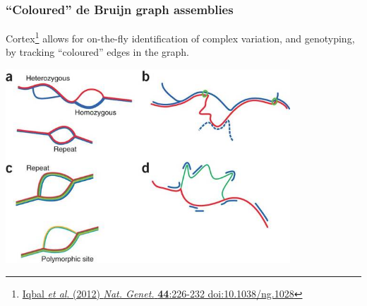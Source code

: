 \begin{frame}
  \frametitle{``Coloured'' de Bruijn graph assemblies}
  Cortex\footnote{\tiny{\href{http://dx.doi.org/10.1038/ng.1028}{Iqbal \textit{et al}. (2012) \textit{Nat. Genet.} \textbf{44}:226-232 doi:10.1038/ng.1028}}} allows for on-the-fly identification of complex variation, and genotyping, by tracking ``coloured'' edges in the graph.
  \begin{center}
    \includegraphics[width=0.8\textwidth]{images/cortex_uses}
  \end{center}  
\end{frame}


